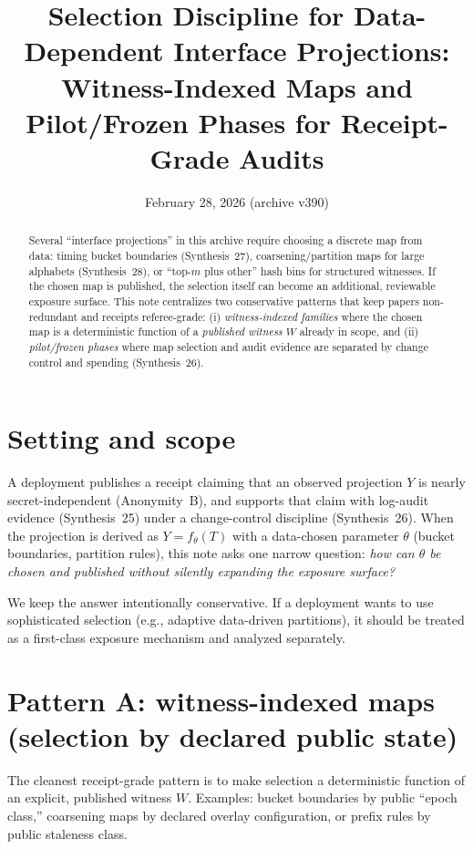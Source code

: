 \documentclass[11pt]{article}
\title{Selection Discipline for Data-Dependent Interface Projections:\\
\large Witness-Indexed Maps and Pilot/Frozen Phases for Receipt-Grade Audits}
\author{}
\date{February 28, 2026 (archive v390)}
\begin{document}
\maketitle

\begin{abstract}
Several ``interface projections'' in this archive require choosing a discrete map from data: timing bucket boundaries (Synthesis~27),
coarsening/partition maps for large alphabets (Synthesis~28), or ``top-$m$ plus other'' hash bins for structured witnesses.
If the chosen map is published, the selection itself can become an additional, reviewable exposure surface.
This note centralizes two conservative patterns that keep papers non-redundant and receipts referee-grade:
(i) \emph{witness-indexed families} where the chosen map is a deterministic function of a \emph{published witness} $W$ already in scope,
and (ii) \emph{pilot/frozen phases} where map selection and audit evidence are separated by change control and spending (Synthesis~26).
\end{abstract}

\section{Setting and scope}
A deployment publishes a receipt claiming that an observed projection $Y$ is nearly secret-independent (Anonymity~B),
and supports that claim with log-audit evidence (Synthesis~25) under a change-control discipline (Synthesis~26).\cite{series:profiling,series:stataudit,series:anytimespend}
When the projection is derived as $Y=f_\theta(T)$ with a data-chosen parameter $\theta$ (bucket boundaries, partition rules),
this note asks one narrow question:
\emph{how can $\theta$ be chosen and published without silently expanding the exposure surface?}

We keep the answer intentionally conservative.
If a deployment wants to use sophisticated selection (e.g., adaptive data-driven partitions), it should be treated as a first-class exposure mechanism and analyzed separately.

\section{Pattern A: witness-indexed maps (selection by declared public state)}
The cleanest receipt-grade pattern is to make selection a deterministic function of an explicit, published witness $W$.
Examples: bucket boundaries by public ``epoch class,'' coarsening maps by declared overlay configuration, or prefix rules by public staleness class.
\end{document}
